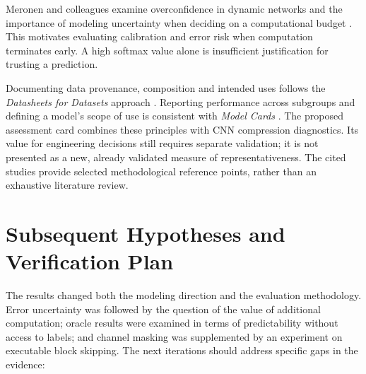 \documentclass[12pt,a4paper]{article}
\begin{document}
Meronen and colleagues examine overconfidence in dynamic networks
and the importance of modeling uncertainty when deciding on
a computational budget \cite{overconfidence}.
This motivates evaluating calibration and error risk when computation
terminates early. A high softmax value alone is insufficient justification
for trusting a prediction.

Documenting data provenance, composition and intended uses follows
the \emph{Datasheets for Datasets} approach \cite{datasheets}.
Reporting performance across subgroups and defining a model's scope
of use is consistent with \emph{Model Cards} \cite{modelcards}.
The proposed assessment card combines these principles with CNN
compression diagnostics.
Its value for engineering decisions still requires separate validation;
it is not presented as a new, already validated measure of representativeness.
The cited studies provide selected methodological reference points,
rather than an exhaustive literature review.

\section{Subsequent Hypotheses and Verification Plan}

The results changed both the modeling direction and the evaluation
methodology.
Error uncertainty was followed by the question of the value of additional
computation; oracle results were examined in terms of predictability
without access to labels; and channel masking was supplemented by
an experiment on executable block skipping.
The next iterations should address specific gaps in the evidence:
\end{document}
